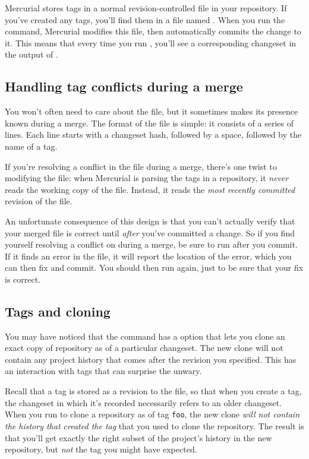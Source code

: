 Mercurial stores tags in a normal revision-controlled file in your
repository.  If you've created any tags, you'll find them in a file
named .  When you run the  command,
Mercurial modifies this file, then automatically commits the change to
it.  This means that every time you run , you'll see a
corresponding changeset in the output of .

\subsection{Handling tag conflicts during a merge}

You won't often need to care about the  file, but
it sometimes makes its presence known during a merge.  The format of
the file is simple: it consists of a series of lines.  Each line
starts with a changeset hash, followed by a space, followed by the
name of a tag.

If you're resolving a conflict in the  file during
a merge, there's one twist to modifying the  file:
when Mercurial is parsing the tags in a repository, it \emph{never}
reads the working copy of the  file.  Instead, it
reads the \emph{most recently committed} revision of the file.

An unfortunate consequence of this design is that you can't actually
verify that your merged  file is correct until
\emph{after} you've committed a change.  So if you find yourself
resolving a conflict on  during a merge, be sure to
run  after you commit.  If it finds an error in the
 file, it will report the location of the error,
which you can then fix and commit.  You should then run 
again, just to be sure that your fix is correct.

\subsection{Tags and cloning}

You may have noticed that the  command has a
 option that lets you clone an exact copy of
repository as of a particular changeset.  The new clone will not
contain any project history that comes after the revision you
specified.  This has an interaction with tags that can surprise the
unwary.

Recall that a tag is stored as a revision to the 
file, so that when you create a tag, the changeset in which it's
recorded necessarily refers to an older changeset.  When you run
 to clone a repository as of tag
\texttt{foo}, the new clone \emph{will not contain the history that
  created the tag} that you used to clone the repository.  The result
is that you'll get exactly the right subset of the project's history
in the new repository, but \emph{not} the tag you might have expected.

